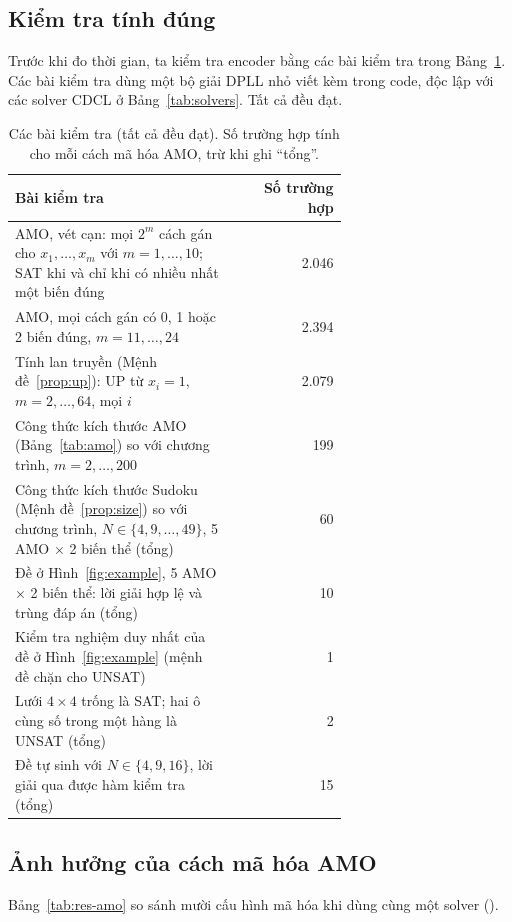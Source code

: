 \documentclass[a4paper,fleqn]{cas-sc}
\begin{document}
\subsection{Kiểm tra tính đúng}\label{sec:validation}

Trước khi đo thời gian, ta kiểm tra encoder bằng các bài kiểm tra trong Bảng~\ref{tab:validation}. Các bài kiểm tra dùng một bộ giải DPLL nhỏ viết kèm trong code, độc lập với các solver CDCL ở Bảng~\ref{tab:solvers}. Tất cả đều đạt.

\begin{table}[t]
\caption{Các bài kiểm tra (tất cả đều đạt). Số trường hợp tính cho mỗi cách mã hóa AMO, trừ khi ghi ``tổng''.}
\label{tab:validation}
\centering\small
\begin{tabular}{p{0.66\linewidth}r}
\toprule
Bài kiểm tra & Số trường hợp\\
\midrule
AMO, vét cạn: mọi $2^m$ cách gán cho $x_1,\dots,x_m$ với $m=1,\dots,10$; SAT khi và chỉ khi có nhiều nhất một biến đúng & 2.046\\
AMO, mọi cách gán có 0, 1 hoặc 2 biến đúng, $m=11,\dots,24$ & 2.394\\
Tính lan truyền (Mệnh đề~\ref{prop:up}): UP từ $x_i=1$, $m=2,\dots,64$, mọi $i$ & 2.079\\
Công thức kích thước AMO (Bảng~\ref{tab:amo}) so với chương trình, $m=2,\dots,200$ & 199\\
Công thức kích thước Sudoku (Mệnh đề~\ref{prop:size}) so với chương trình, $N\in\{4,9,\dots,49\}$, 5 AMO $\times$ 2 biến thể (tổng) & 60\\
Đề ở Hình~\ref{fig:example}, 5 AMO $\times$ 2 biến thể: lời giải hợp lệ và trùng đáp án (tổng) & 10\\
Kiểm tra nghiệm duy nhất của đề ở Hình~\ref{fig:example} (mệnh đề chặn cho UNSAT) & 1\\
Lưới $4\times4$ trống là SAT; hai ô cùng số trong một hàng là UNSAT (tổng) & 2\\
Đề tự sinh với $N\in\{4,9,16\}$, lời giải qua được hàm kiểm tra (tổng) & 15\\
\bottomrule
\end{tabular}
\end{table}

\subsection{Ảnh hưởng của cách mã hóa AMO}\label{sec:exp-amo}

Bảng~\ref{tab:res-amo} so sánh mười cấu hình mã hóa khi dùng cùng một solver (\FixedSolver). \AutoAmo
\end{document}
